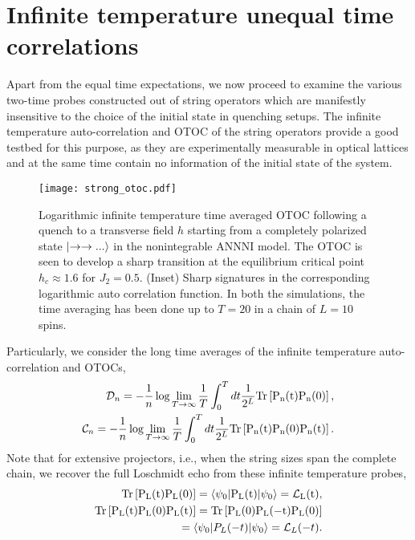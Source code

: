 \documentclass[aps,prx,twocolumn]{revtex4-2}
\begin{document}
\section{Infinite temperature unequal time correlations}
\label{sec:otoc}

Apart from the equal time expectations, we now proceed to examine the various two-time probes constructed out of string operators which are manifestly insensitive to the choice of the initial state in quenching setups. The infinite temperature auto-correlation and OTOC of the string operators provide a good testbed for this purpose, as they are experimentally measurable in optical lattices and at the same time contain no information of the initial state of the system.
\begin{figure}
	\centering
	\texttt{[image: strong\_otoc.pdf]}
	
	\caption{ {Logarithmic infinite temperature time averaged OTOC following a quench to a transverse field $h$ starting from a completely polarized state $\ket{\rightarrow\rightarrow...}$ in the nonintegrable ANNNI model. The OTOC is seen to develop a sharp transition at the equilibrium critical point $h_c\approx 1.6$ for $J_2=0.5$}. (Inset) Sharp signatures in the corresponding logarithmic auto correlation function. In both the simulations, the time averaging has been done up to $T=20$ in a chain of $L=10$ spins.}
	\label{fig:10} 
\end{figure}
 Particularly, we consider the long time averages of the infinite temperature auto-correlation and OTOCs,
\begin{eqnarray}\label{eq:inf_corr}\
\nonumber\mathcal{D}_n=-\frac{1}{n}\log\lim\limits_{T\rightarrow\infty}\frac{1}{T}\int_{0}^{T}dt\frac{1}{2^L}\rm{Tr}\left[P_n(t)P_n(0)\right],\\
\mathcal{C}_n=
-\frac{1}{n}\log\lim\limits_{T\rightarrow\infty}\frac{1}{T}\int_{0}^{T}dt\frac{1}{2^L}\rm{Tr}\left[P_n(t)P_n(0)P_n(t)\right].
\end{eqnarray}
Note that for extensive projectors, i.e., when the string sizes span the complete chain, we recover the full Loschmidt echo from these infinite temperature probes,
\begin{equation}
\begin{split}
\rm{Tr}\left[P_L(t)P_L(0)\right]=\braket{\psi_0|P_L(t)|\psi_0}=\mathcal{L}_L(t),\\
\rm{Tr}\left[P_L(t)P_L(0)P_L(t)\right]=\rm{Tr}\left[P_L(0)P_L(-t)P_L(0)\right]\\
=\braket{\psi_0|P_L(-t)|\psi_0}=\mathcal{L}_L(-t).
\end{split}
\end{equation}
\end{document}
